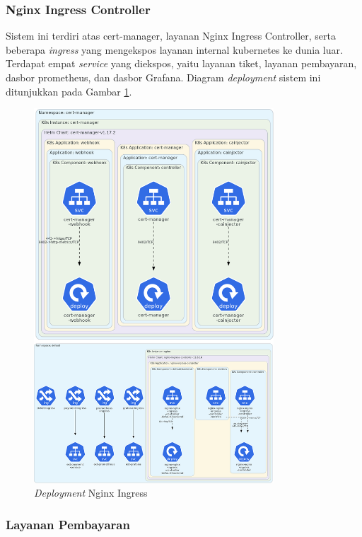 \subsubsection{Nginx Ingress Controller}

Sistem ini terdiri atas cert-manager, layanan Nginx Ingress Controller, serta beberapa \textit{ingress} yang mengekspos layanan internal kubernetes ke dunia luar. Terdapat empat \textit{service} yang diekspos, yaitu layanan tiket, layanan pembayaran, dasbor prometheus, dan dasbor Grafana. Diagram \textit{deployment} sistem ini ditunjukkan pada Gambar \ref{fig:deployment-nginx}.

\begin{figure}[H]
    \centering
    \includegraphics[width=0.8\textwidth]{resources/chapter-4/nginx-1.png}
    \caption{\textit{Deployment} Nginx Ingress}
    \label{fig:deployment-nginx}
\end{figure}

\pagebreak

\subsubsection{Layanan Pembayaran}

